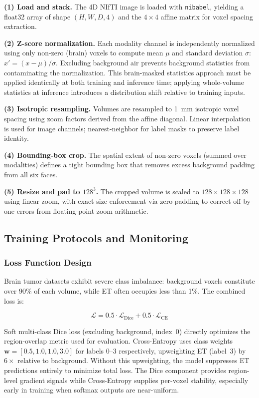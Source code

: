 \documentclass[10pt,twocolumn]{article}
\begin{document}
\textbf{(1) Load and stack.} The 4D NIfTI image is loaded with
\texttt{nibabel}, yielding a float32 array of shape $(H, W, D,
4)$ and the $4 \times 4$ affine matrix for voxel spacing
extraction.

\textbf{(2) Z-score normalization.} Each modality channel is
independently normalized using only non-zero (brain) voxels to
compute mean $\mu$ and standard deviation $\sigma$:
$x' = (x - \mu) / \sigma$. Excluding background air prevents
background statistics from contaminating the normalization.
This brain-masked statistics approach must be applied
identically at both training and inference time; applying
whole-volume statistics at inference introduces a distribution
shift relative to training inputs.

\textbf{(3) Isotropic resampling.} Volumes are resampled to
1~mm isotropic voxel spacing using zoom factors derived from the
affine diagonal. Linear interpolation is used for image channels;
nearest-neighbor for label masks to preserve label identity.

\textbf{(4) Bounding-box crop.} The spatial extent of non-zero
voxels (summed over modalities) defines a tight bounding box that
removes excess background padding from all six faces.

\textbf{(5) Resize and pad to $128^3$.} The cropped volume is
scaled to $128 \times 128 \times 128$ using linear zoom, with
exact-size enforcement via zero-padding to correct off-by-one
errors from floating-point zoom arithmetic.

\subsection{Training Protocols and Monitoring}

\subsubsection{Loss Function Design}

Brain tumor datasets exhibit severe class imbalance: background
voxels constitute over 90\% of each volume, while ET often
occupies less than 1\%. The combined loss is:

\begin{equation}
  \mathcal{L} = 0.5 \cdot \mathcal{L}_{\mathrm{Dice}}
  + 0.5 \cdot \mathcal{L}_{\mathrm{CE}}
\end{equation}

Soft multi-class Dice loss (excluding background, index~0)
directly optimizes the region-overlap metric used for evaluation.
Cross-Entropy uses class weights $\mathbf{w} = [0.5, 1.0, 1.0,
3.0]$ for labels 0--3 respectively, upweighting ET (label~3) by
$6\times$ relative to background. Without this upweighting, the
model suppresses ET predictions entirely to minimize total loss.
The Dice component provides region-level gradient signals while
Cross-Entropy supplies per-voxel stability, especially early in
training when softmax outputs are near-uniform.
\end{document}

